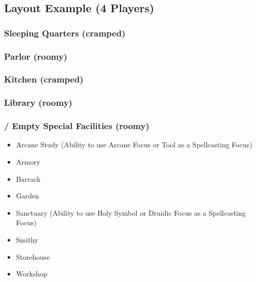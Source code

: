 \subsection*{Layout Example (4 Players)}
\hspace*{-0.35em}%
\subsubsection*{ Sleeping Quarters (cramped)}
\subsubsection*{ Parlor (roomy)}
\subsubsection*{ Kitchen (cramped)}
\subsubsection*{ Library (roomy)}
\subsubsection*{/ Empty Special Facilities (roomy)}
{\entryfont%
	\begin{itemize}
		\item Arcane Study (Ability to use Arcane Focus or Tool as a Spellcasting Focus)
		\item Armory
		\item Barrack
		\item Garden
		\item Sanctuary (Ability to use Holy Symbol or Druidic Focus as a Spellcasting Focus)
		\item Smithy
		\item Storehouse
		\item Workshop
	\end{itemize}
}%